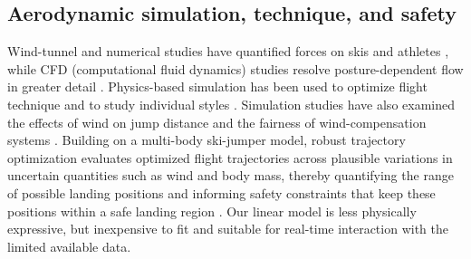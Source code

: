 \documentclass[11pt,twoside,a4paper]{article}
\begin{document}
\subsection{Aerodynamic simulation, technique, and safety}

Wind-tunnel and numerical studies have quantified forces on skis and athletes \cite{seo2004aerodynamic,virmavirta2019aerodynamics,barnes2022flight}, while CFD (computational fluid dynamics) studies resolve posture-dependent flow in greater detail \cite{meile2006aerodynamics,ryu2015aerodynamic,yamamoto2022transient,hu2024unfavorable}. Physics-based simulation has been used to optimize flight technique \cite{muller2008simulation,seo2004optimal,jung2019optimization} and to study individual styles \cite{schmolzer2005individual}. Simulation studies have also examined the effects of wind on jump distance and the fairness of wind-compensation systems \cite{virmavirta2012wind,jung2018wind,jung2021windcorrigendum}. Building on a multi-body ski-jumper model, robust trajectory optimization evaluates optimized flight trajectories across plausible variations in uncertain quantities such as wind and body mass, thereby quantifying the range of possible landing positions and informing safety constraints that keep these positions within a safe landing region \cite{piprek2018multibody,piprek2018robust}. Our linear model is less physically expressive, but inexpensive to fit and suitable for real-time interaction with the limited available data.
\end{document}
